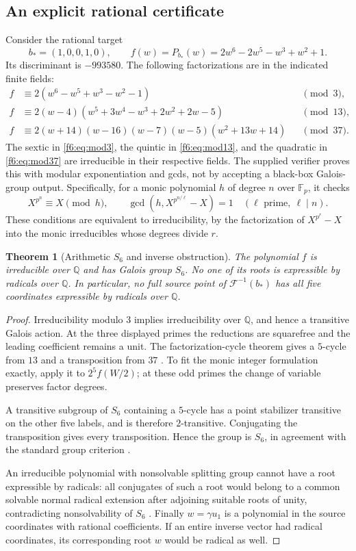 \documentclass[11pt,a4paper]{article}
\newtheorem{theorem}{Theorem}[section]
\theoremstyle{definition}
\newcommand{\Q}{\mathbb Q}
\newcommand{\F}{\mathcal F}
\begin{document}
\subsection{An explicit rational certificate}
Consider the rational target
\[
 b_*=(1,0,0,1,0),\qquad
 f(w)=P_{b_*}(w)=2w^6-2w^5-w^3+w^2+1.
\]
Its discriminant is $-993580$. The following factorizations are in the
indicated finite fields:
\begin{align}
 f&\equiv2(w^6-w^5+w^3-w^2-1)&&\pmod3,\label{f6:eq:mod3}\\
 f&\equiv2(w-4)(w^5+3w^4-w^3+2w^2+2w-5)&&\pmod{13},\label{f6:eq:mod13}\\
 f&\equiv2(w+14)(w-16)(w-7)(w-5)(w^2+13w+14)&&\pmod{37}.
 \label{f6:eq:mod37}
\end{align}
The sextic in \eqref{f6:eq:mod3}, the quintic in \eqref{f6:eq:mod13}, and the
quadratic in \eqref{f6:eq:mod37} are irreducible in their respective fields.
The supplied verifier proves this with modular exponentiation and gcds,
not by accepting a black-box Galois-group output. Specifically, for a
monic polynomial $h$ of degree $n$ over $\mathbb F_p$, it checks
\[
 X^{p^n}\equiv X\pmod h,
 \qquad
 \gcd(h,X^{p^{n/\ell}}-X)=1
 \quad(\ell\text{ prime},\ \ell\mid n).
\]
These conditions are equivalent to irreducibility, by the factorization
of $X^{p^r}-X$ into the monic irreducibles whose degrees divide $r$.

\begin{theorem}[Arithmetic $S_6$ and inverse obstruction]
\label{f6:thm:arithmeticS6}
The polynomial $f$ is irreducible over $\Q$ and has Galois group $S_6$.
No one of its roots is expressible by radicals over $\Q$. In particular,
no full source point of $\F^{-1}(b_*)$ has all five coordinates expressible
by radicals over $\Q$.
\end{theorem}
\begin{proof}
Irreducibility modulo $3$ implies irreducibility over $\Q$, and hence a
transitive Galois action. At the three displayed primes the reductions
are squarefree and the leading coefficient remains a unit. The
factorization-cycle theorem gives a $5$-cycle from $13$ and a
transposition from $37$ \cite[Theorem 4.28]{Milne}. To fit the monic
integer formulation exactly, apply it to $2^5f(W/2)$; at these odd
primes the change of variable preserves factor degrees.

A transitive subgroup of $S_6$ containing a $5$-cycle has a point
stabilizer transitive on the other five labels, and is therefore
$2$-transitive. Conjugating the transposition gives every transposition.
Hence the group is $S_6$, in agreement with the standard group criterion
\cite[Lemma 4.31]{Milne}.

An irreducible polynomial with nonsolvable splitting group cannot have
a root expressible by radicals: all conjugates of such a root would
belong to a common solvable normal radical extension after adjoining
suitable roots of unity, contradicting nonsolvability of $S_6$
\cite[\S5, solvability theorem]{Milne}.
Finally $w=\gamma u_1$ is a polynomial in the source coordinates with
rational coefficients. If an entire inverse vector had radical
coordinates, its corresponding root $w$ would be radical as well.
\end{proof}
\end{document}
